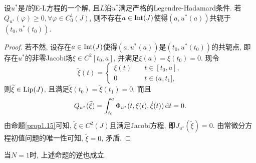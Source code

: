 \begin{proposition}[必要条件2]
    设$u^*$是$I$的E-L方程的一个解, 且$L$沿$u^*$满足严格的Legendre-Hadamard条件.
    若$Q_{u^*}(\varphi) \geq 0, \forall \varphi \in C_0^1(J)$, 则不存在$a \in {\rm Int}(J)$使得$(a, u^*(a))$共轭于$(t_0, u^*(t_0))$.
    \begin{proof}
        若不然, 设存在$a \in {\rm Int}(J)$使得$(a, u^*(a))$是$(t_0, u^*(t_0))$的共轭点, 即存在$u^*$的非零Jacobi场$\xi \in C^2[t_0, a]$, 并满足$\xi(a) = \xi(t_0) = 0$.
        现令 
        \begin{equation*}
            \widetilde{\xi}(t) =  
            \begin{cases} 
                \xi(t) \quad &t \in  [t_0, a], \\  
                0 \quad &t \in (a, t_1], 
            \end{cases} 
        \end{equation*}
        则$\widetilde{\xi} \in {\rm Lip}(J)$, 且满足$\widetilde{\xi}(t_0) = \widetilde{\xi}(t_1) = 0$, 而且 
        \begin{equation*}
            Q_{u^*}(\widetilde{\xi}) = \int_{t_0}^a\Phi_{u^*}(t, \xi(t), \dot\xi(t)) \,{\rm d}t = 0.
        \end{equation*}
        由命题\ref{prop1.15}可知, $\widetilde{\xi} \in C^2(J)$且满足Jacobi方程, 即$J_{u^*}(\widetilde{\xi}) = 0$.
        由常微分方程初值问题的唯一性可知, $\widetilde{\xi} = 0$, 矛盾.
    \end{proof}  
\end{proposition}

当$N = 1$时, 上述命题的逆也成立.

